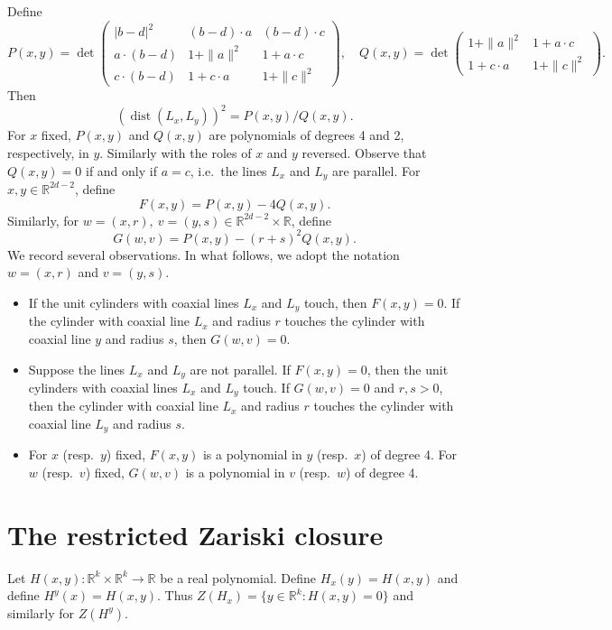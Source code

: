 \documentclass[letterpaper, reqno, 11pt]{article}
\numberwithin{equation}{section}
\newcommand{\RR}{\mathbb{R}}
\theoremstyle{remark}
\begin{document}
Define
\[
P(x,y) = \det \begin{pmatrix}
            |b-d|^2 		& 	(b-d)\cdot a  	& 	(b-d)\cdot c  \\
             a \cdot (b-d) & 	1 + \|a\|^2 	& 	1 +  a\cdot c   \\
            c \cdot (b-d) & 	1 + c\cdot a 	& 	1 + \|c\|^2
        \end{pmatrix},\quad
        Q(x,y) = \det \begin{pmatrix}
            1 + \|a\|^2 & 1 + a\cdot c \\
            1 +  c \cdot a & 1 + \|c\|^2
        \end{pmatrix}.
\]
%
Then 
\begin{equation}
    (\operatorname{dist}(L_{x}, L_{y}))^2 = P(x,y) / Q(x,y).
\end{equation}
For $x$ fixed, $P(x, y)$ and $Q(x, y)$ are polynomials of degrees 4 and 2, respectively, in $y$. Similarly with the roles of $x$ and $y$ reversed. Observe that $Q(x,y)=0$ if and only if $a=c$, i.e.~the lines $L_x$ and $L_y$ are parallel.
%
For $x,y\in\RR^{2d-2}$, define 
\begin{equation}\label{defnF}
F(x,y) = P(x,y) - 4Q(x,y).
\end{equation}
Similarly, for $w=(x,r),\ v=(y, s) \in \RR^{2d-2}\times \RR$, define 
\begin{equation}\label{defnG}
G(w,v)  = P(x,y) - (r+s)^2Q(x,y).
\end{equation} 
We record several observations. In what follows, we adopt the notation $w = (x,r)$ and $v = (y,s)$.
\begin{itemize}
	\item If the unit cylinders with coaxial lines $L_x$ and $L_y$ touch, then $F(x,y) = 0$. If the cylinder with coaxial line $L_x$ and radius $r$ touches the cylinder with coaxial line $y$ and radius $s$, then $G(w,v) = 0$.
	\item Suppose the lines $L_x$ and $L_{y}$ are not parallel. If $F(x,y)=0$, then the unit cylinders with coaxial lines $L_x$ and $L_y$ touch. If $G(w,v)=0$ and $r,s>0$, then the cylinder with coaxial line $L_x$ and radius $r$ touches the cylinder with coaxial line $L_y$ and radius $s$.
	\item For $x$ (resp.~$y$) fixed, $F(x,y)$ is a polynomial in $y$ (resp.~$x$) of degree 4. For $w$ (resp.~$v$) fixed, $G(w,v)$ is a polynomial in $v$ (resp.~$w$) of degree 4. 
\end{itemize}


\section{The restricted Zariski closure}
Let $H(x,y)\colon \RR^{k}\times\RR^k\to\RR$ be a real polynomial. Define $H_x(y) = H(x,y)$ and define $H^y(x) = H(x,y)$. Thus $Z(H_x)=\{y\in \RR^k\colon H(x,y) = 0\}$ and similarly for $Z(H^y)$. 
\end{document}
